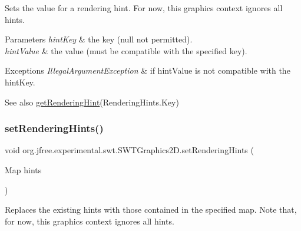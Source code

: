 Sets the value for a rendering hint. For now, this graphics context ignores all hints.


\begin{DoxyParams}{Parameters}
{\em hint\+Key} & the key ({\ttfamily null} not permitted). \\
\hline
{\em hint\+Value} & the value (must be compatible with the specified key).\\
\hline
\end{DoxyParams}

\begin{DoxyExceptions}{Exceptions}
{\em Illegal\+Argument\+Exception} & if {\ttfamily hint\+Value} is not compatible with the {\ttfamily hint\+Key}.\\
\hline
\end{DoxyExceptions}
\begin{DoxySeeAlso}{See also}
\mbox{\hyperlink{classorg_1_1jfree_1_1experimental_1_1swt_1_1_s_w_t_graphics2_d_a9dadf87bbe1bd875799c1764834fade2}{get\+Rendering\+Hint}}(Rendering\+Hints.\+Key) 
\end{DoxySeeAlso}
\mbox{\label{classorg_1_1jfree_1_1experimental_1_1swt_1_1_s_w_t_graphics2_d_adcf05fe2a29c5bf8aa05ae31c6fb5a7e}} 
\subsubsection{\texorpdfstring{set\+Rendering\+Hints()}{setRenderingHints()}}
{\footnotesize\ttfamily void org.\+jfree.\+experimental.\+swt.\+S\+W\+T\+Graphics2\+D.\+set\+Rendering\+Hints (\begin{DoxyParamCaption}\item[{Map}]{hints }\end{DoxyParamCaption})}

Replaces the existing hints with those contained in the specified map. Note that, for now, this graphics context ignores all hints.


